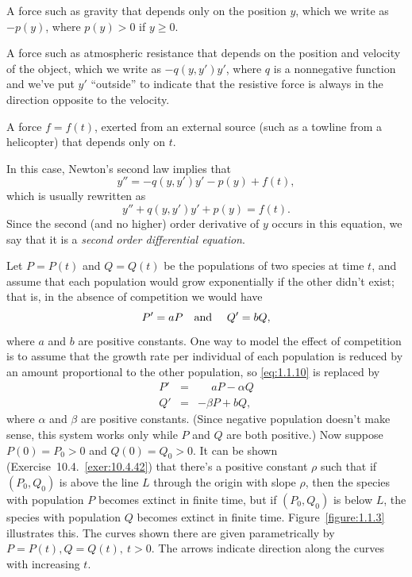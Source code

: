 \documentclass{ximera}
\begin{document}
\begin{alist}
\item %
A force such as gravity that depends only on the position $y$,
which we write as $-p(y)$, where $p(y)>0$ if $y\ge0$.

\item %
A force such as atmospheric resistance that depends on
the position and velocity of the object, which we write as
$-q(y,y')y'$, where $q$ is a nonnegative function and we've
put $y'$ ``outside'' to indicate that the resistive force is
always in the direction opposite to the velocity.
\item %
A force $f=f(t)$, exerted from an external source (such as a towline
from a helicopter) that depends only on $t$.
\end{alist}

In this case, Newton's second law implies that
$$
y''=-q(y,y')y'-p(y)+f(t),
$$
which is usually rewritten as
$$
y''+q(y,y')y'+p(y)=f(t).
$$
Since the  second (and no higher) order derivative of $y$ occurs in
this equation, we say that it is a {\color{blue}\it second order differential
equation\/}.


\noindent
Let $P=P(t)$ and $Q=Q(t)$ be the populations of two species at time
$t$, and assume that each population would grow exponentially if the
other didn't exist; that is, in the absence of competition we would
have
\begin{equation} \label{eq:1.1.10}
P'=aP \mbox{\quad and \quad}Q'=bQ,
\end{equation}
where $a$ and $b$ are positive constants. One way to model the effect
of competition is to assume that the growth rate per individual of
each population is reduced by an amount proportional to the other
population, so \eqref{eq:1.1.10} is replaced by
\begin{eqnarray*}
P'&=&\phantom{-}aP-\alpha Q\\
Q'&=&-\beta P+bQ,
\end{eqnarray*}
where $\alpha$ and $\beta$ are positive constants. (Since negative
population doesn't make sense, this system works only while $P$ and
$Q$ are both positive.) Now suppose   $P(0)=P_0>0$ and
$Q(0)=Q_0>0$. It can be shown (Exercise~10.4.~\hspace*{-3pt}\ref{exer:10.4.42})
that there's a  positive constant $\rho$ such that if
$(P_0,Q_0)$ is above the line $L$ through the origin with slope $\rho$,
then the species with population $P$ becomes extinct in finite time,
but if $(P_0,Q_0)$ is below $L$,   the species with population
$Q$ becomes extinct in finite time. Figure~\ref{figure:1.1.3} illustrates
this. The curves shown there are given parametrically by $P=P(t),
Q=Q(t),\ t>0$.
 The arrows indicate direction along the curves with
increasing $t$.
\end{document}
